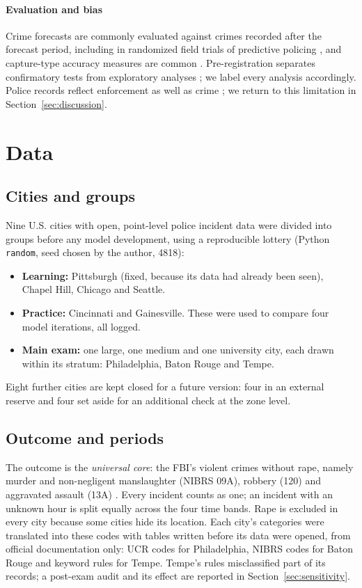 \documentclass[preprint,12pt,authoryear]{elsarticle}
\begin{document}
\paragraph{Evaluation and bias} Crime forecasts are commonly evaluated against crimes recorded after the forecast period, including in randomized field trials of predictive policing \citep{mohler2015trials}, and capture-type accuracy measures are common \citep{accuracy2020}. Pre-registration separates confirmatory tests from exploratory analyses \citep{nosek2018prereg}; we label every analysis accordingly. Police records reflect enforcement as well as crime \citep{lum2016predict}; we return to this limitation in Section~\ref{sec:discussion}.

\section{Data}\label{sec:data}

\subsection{Cities and groups}
Nine U.S. cities with open, point-level police incident data were divided into groups before any model development, using a reproducible lottery (Python \texttt{random}, seed chosen by the author, 4818):
\begin{itemize}
  \item \textbf{Learning:} Pittsburgh (fixed, because its data had already been seen), Chapel Hill, Chicago and Seattle.
  \item \textbf{Practice:} Cincinnati and Gainesville. These were used to compare four model iterations, all logged.
  \item \textbf{Main exam:} one large, one medium and one university city, each drawn within its stratum: Philadelphia, Baton Rouge and Tempe.
\end{itemize}
Eight further cities are kept closed for a future version: four in an external reserve and four set aside for an additional check at the zone level.

\subsection{Outcome and periods}
The outcome is the \emph{universal core}: the FBI's violent crimes without rape, namely murder and non-negligent manslaughter (NIBRS 09A), robbery (120) and aggravated assault (13A) \citep{fbi2023nibrs}. Every incident counts as one; an incident with an unknown hour is split equally across the four time bands. Rape is excluded in every city because some cities hide its location. Each city's categories were translated into these codes with tables written before its data were opened, from official documentation only: UCR codes for Philadelphia, NIBRS codes for Baton Rouge and keyword rules for Tempe. Tempe's rules misclassified part of its records; a post-exam audit and its effect are reported in Section~\ref{sec:sensitivity}.
\end{document}
